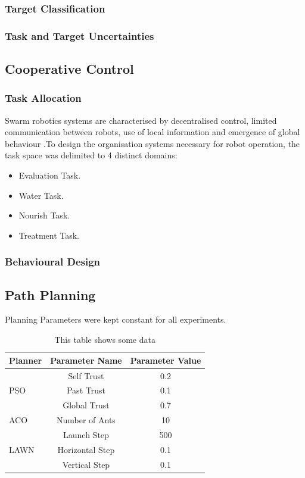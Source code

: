 \documentclass{report}
\begin{document}
\subsubsection{Target Classification}
\subsubsection{Task and Target Uncertainties}

\subsection{Cooperative Control}

\subsubsection{Task Allocation}
Swarm robotics systems are characterised by decentralised control, limited communication between robots, use of local information and emergence of global behaviour \cite{Dorigo2013}.To design the organisation systems necessary for robot operation, the task space was delimited to 4 distinct domains:
\begin{itemize}
	\item Evaluation Task.
	\item Water Task.
	\item Nourish Task.
	\item Treatment Task.
\end{itemize}

\subsubsection{Behavioural Design}

\subsection{Path Planning}
Planning Parameters were kept constant for all experiments.

\bgroup
\def\arraystretch{1.5}%
\begin{table}[h]
  \centering
  \begin{tabular}{|l|c|c|}
  \hline
  \textbf{Planner} & \textbf{Parameter Name} & \textbf{Parameter Value} \\
  \hline
  \multirow{3}{*}{PSO} & Self Trust & 0.2 \\
	& Past Trust & 0.1 \\
	& Global Trust & 0.7 \\
  \hline
  ACO & Number of Ants & 10 \\
  \hline
  \multirow{3}{*}{LAWN} & Launch Step & 500 \\
	& Horizontal Step & 0.1 \\
	& Vertical Step & 0.1 \\
  \hline
  \end{tabular}
  \caption{This table shows some data}
  \label{tab:myfirsttable}
\end{table}
\egroup
\end{document}
